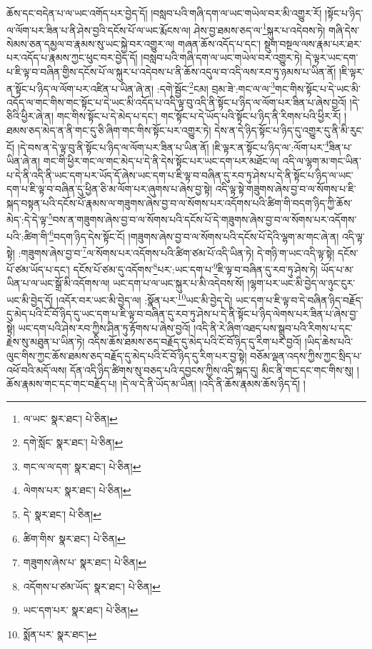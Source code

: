 ཆོས་དང་བདེན་པ་ལ་ཡང་འགོད་པར་བྱེད་དོ། །བསླབ་པའི་གཞི་དག་ལ་ཡང་གཡེལ་བར་མི་འགྱུར་རོ། །སྟོང་པ་ཉིད་ལ་ལོག་པར་ཟིན་པ་ནི་ཤེས་བྱའི་དངོས་པོ་ལ་ཡང་རྨོངས་ལ། ཤེས་བྱ་ཐམས་ཅད་ལ་\footnote{ལ་ཡང་  སྣར་ཐང་།  པེ་ཅིན། }སྐུར་པ་འདེབས་ཏེ། གཞི་དེས་སེམས་ཅན་དམྱལ་བ་རྣམས་སུ་ཡང་སྐྱེ་བར་འགྱུར་ལ། གཞན་ཆོས་འདོད་པ་དང་། སྡུག་བསྔལ་ལས་རྣམ་པར་ཐར་པར་འདོད་པ་རྣམས་ཀྱང་ཕུང་བར་བྱེད་དོ། །བསླབ་པའི་གཞི་དག་ལ་ཡང་གཡེལ་བར་འགྱུར་ཏེ། དེ་ལྟར་ཡང་དག་པ་ཇི་ལྟ་བ་བཞིན་གྱིས་དངོས་པོ་ལ་སྐུར་པ་འདེབས་པ་ནི་ཆོས་འདུལ་བ་འདི་ལས་རབ་ཏུ་ཉམས་པ་ཡིན་ནོ། །ཇི་ལྟར་ན་སྟོང་པ་ཉིད་ལ་ལོག་པར་འཛིན་པ་ཡིན་ཞེ་ན། :དགེ་སྦྱོང་\footnote{དགེ་སློང་  སྣར་ཐང་།  པེ་ཅིན། }ངམ། བྲམ་ཟེ་:གང་ལ་ལ་\footnote{གང་ལ་ལ་དག་  སྣར་ཐང་།  པེ་ཅིན། }གང་གིས་སྟོང་པ་དེ་ཡང་མི་འདོད་ལ་གང་གིས་གང་སྟོང་པ་དེ་ཡང་མི་འདོད་པ་འདི་ལྟ་བུ་འདི་ནི་སྟོང་པ་ཉིད་ལ་ལོག་པར་ཟིན་པ་ཞེས་བྱའོ། །དེ་ཅིའི་ཕྱིར་ཞེ་ན། གང་གིས་སྟོང་པ་དེ་མེད་པ་དང་། གང་སྟོང་པ་དེ་ཡོད་པའི་སྟོང་པ་ཉིད་ནི་རིགས་པའི་ཕྱིར་རོ། །ཐམས་ཅད་མེད་ན་ནི་གང་དུ་ཅི་ཞིག་གང་གིས་སྟོང་པར་འགྱུར་ཏེ། དེས་ན་དེ་ཉིད་སྟོང་པ་ཉིད་དུ་འགྱུར་དུ་ནི་མི་རུང་ངོ། །དེ་བས་ན་དེ་ལྟ་བུ་ནི་སྟོང་པ་ཉིད་ལ་ལོག་པར་ཟིན་པ་ཡིན་ནོ། །ཇི་ལྟར་ན་སྟོང་པ་ཉིད་ལ་:ལོག་པར་\footnote{ལེགས་པར་  སྣར་ཐང་།  པེ་ཅིན། }ཟིན་པ་ཡིན་ཞེ་ན། གང་གི་ཕྱིར་གང་ལ་གང་མེད་པ་དེ་ནི་དེས་སྟོང་པར་ཡང་དག་པར་མཐོང་ལ། འདི་ལ་ལྷག་མ་གང་ཡིན་པ་དེ་ནི་འདི་ནི་ཡང་དག་པར་ཡོད་དོ་ཞེས་ཡང་དག་པ་ཇི་ལྟ་བ་བཞིན་དུ་རབ་ཏུ་ཤེས་པ་དེ་ནི་སྟོང་པ་ཉིད་ལ་ཡང་དག་པ་ཇི་ལྟ་བ་བཞིན་དུ་ཕྱིན་ཅི་མ་ལོག་པར་ཞུགས་པ་ཞེས་བྱ་སྟེ། འདི་ལྟ་སྟེ་གཟུགས་ཞེས་བྱ་བ་ལ་སོགས་པ་ཇི་སྐད་བསྟན་པའི་དངོས་པོ་རྣམས་ལ་གཟུགས་ཞེས་བྱ་བ་ལ་སོགས་པར་འདོགས་པའི་ཚིག་གི་བདག་ཉིད་ཀྱི་ཆོས་མེད་:དེ་དེ་ལྟ་\footnote{དེ་  སྣར་ཐང་།  པེ་ཅིན། }བས་ན་གཟུགས་ཞེས་བྱ་བ་ལ་སོགས་པའི་དངོས་པོ་དེ་གཟུགས་ཞེས་བྱ་བ་ལ་སོགས་པར་འདོགས་པའི་:ཚིག་གི་\footnote{ཚིག་གིས་  སྣར་ཐང་།  པེ་ཅིན། }བདག་ཉིད་དེས་སྟོང་ངོ། །གཟུགས་ཞེས་བྱ་བ་ལ་སོགས་པའི་དངོས་པོ་དེའི་ལྷག་མ་གང་ཞེ་ན། འདི་ལྟ་སྟེ། :གཟུགས་ཞེས་བྱ་བ་\footnote{གཟུགས་ཞེས་པ་  སྣར་ཐང་།  པེ་ཅིན། }ལ་སོགས་པར་འདོགས་པའི་ཚིག་ཙམ་པོ་འདི་ཡིན་ཏེ། དེ་གཉི་ག་ཡང་འདི་ལྟ་སྟེ། དངོས་པོ་ཙམ་ཡོད་པ་དང་། དངོས་པོ་ཙམ་དུ་འདོགས་\footnote{འདོགས་པ་ཙམ་ཡོད་  སྣར་ཐང་།  པེ་ཅིན། }པར་:ཡང་དག་པ་\footnote{ཡང་དག་པར་  སྣར་ཐང་།  པེ་ཅིན། }ཇི་ལྟ་བ་བཞིན་དུ་རབ་ཏུ་ཤེས་ཏེ། ཡོད་པ་མ་ཡིན་པ་ལ་ཡང་སྒྲོ་མི་འདོགས་ལ། ཡང་དག་པ་ལ་ཡང་སྐུར་པ་མི་འདེབས་སོ། །ལྷག་པར་ཡང་མི་བྱེད་ལ་ཉུང་ངུར་ཡང་མི་བྱེད་དོ། །འདོར་བར་ཡང་མི་བྱེད་ལ། :སྣོན་པར་\footnote{སྨོན་པར་  སྣར་ཐང་། }ཡང་མི་བྱེད་དེ། ཡང་དག་པ་ཇི་ལྟ་བ་དེ་བཞིན་ཉིད་བརྗོད་དུ་མེད་པའི་ངོ་བོ་ཉིད་དུ་ཡང་དག་པ་ཇི་ལྟ་བ་བཞིན་དུ་རབ་ཏུ་ཤེས་པ་དེ་ནི་སྟོང་པ་ཉིད་ལེགས་པར་ཟིན་པ་ཞེས་བྱ་སྟེ། ཡང་དག་པའི་ཤེས་རབ་ཀྱིས་ཤིན་ཏུ་རྟོགས་པ་ཞེས་བྱའོ། །འདི་ནི་རེ་ཞིག་འཐད་པས་སྒྲུབ་པའི་རིགས་པ་དང་རྗེས་སུ་མཐུན་པ་ཡིན་ཏེ། འདིས་ཆོས་ཐམས་ཅད་བརྗོད་དུ་མེད་པའི་ངོ་བོ་ཉིད་དུ་རིག་པར་བྱའོ། །ཡིད་ཆེས་པའི་ལུང་གིས་ཀྱང་ཆོས་ཐམས་ཅད་བརྗོད་དུ་མེད་པའི་ངོ་བོ་ཉིད་དུ་རིག་པར་བྱ་སྟེ། བཅོམ་ལྡན་འདས་ཀྱིས་ཀྱང་སྲིད་པ་འཕོ་བའི་མདོ་ལས། དོན་འདི་ཉིད་ཚིགས་སུ་བཅད་པའི་དབྱངས་ཀྱིས་འདི་སྐད་དུ། མིང་ནི་གང་དང་གང་གིས་སུ། །ཆོས་རྣམས་གང་དང་གང་བརྗོད་པ། །དེ་ལ་དེ་ནི་ཡོད་མ་ཡིན། །འདི་ནི་ཆོས་རྣམས་ཆོས་ཉིད་དོ། །
